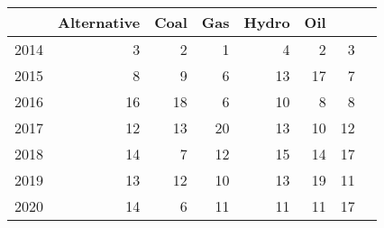 \begin{table}[ht]
\centering
\begin{tabular}{rrrrrrrr}
  \hline
 & Alternative & Coal & Gas & Hydro & Oil\\ 
  \hline
2014 &   3 &   2 &   1 &   4 &   2 &   3 \\ 
  2015 &   8 &   9 &   6 &  13 &  17 &   7 \\ 
  2016 &  16 &  18 &   6 &  10 &   8 &   8 \\ 
  2017 &  12 &  13 &  20 &  13 &  10 &  12 \\ 
  2018 &  14 &   7 &  12 &  15 &  14 &  17 \\ 
  2019 &  13 &  12 &  10 &  13 &  19 &  11 \\ 
  2020 &  14 &   6 &  11 &  11 &  11 &  17  \\ 
   \hline
\end{tabular}
\end{table}
